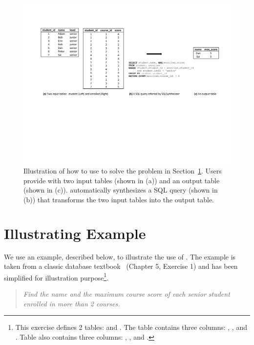 
\begin{figure}[t]
  \centering
  \includegraphics[scale=0.75]{motivating}
  \vspace*{-4.0ex}\caption {{\label{fig:motivating}
  Illustration of how to use \ourtool to solve the problem in Section~\ref{sec:example}. Users provide \ourtool with
  two input tables (shown in (a)) and an output table (shown in (c)).
  \ourtool automatically synthesizes a SQL query (shown in (b)) that
  transforms the two input tables into the output table.
}}
\end{figure}

\section{Illustrating Example}
\label{sec:example}

We use an example, described below, to illustrate the use
of \ourtool. The example is taken from a classic
database textbook~\cite{cowbook} (Chapter 5, Exercise 1)
and has been simplified for illustration purpose\footnote{
This exercise defines 2 tables: 
and . The  table
contains three columns: , ,
and . Table  also contains
three columns: , ,
and .
}.

\begin{quote}
\textit{Find the name and the maximum course score of each senior student
enrolled in more than 2 courses.}
\end{quote}

